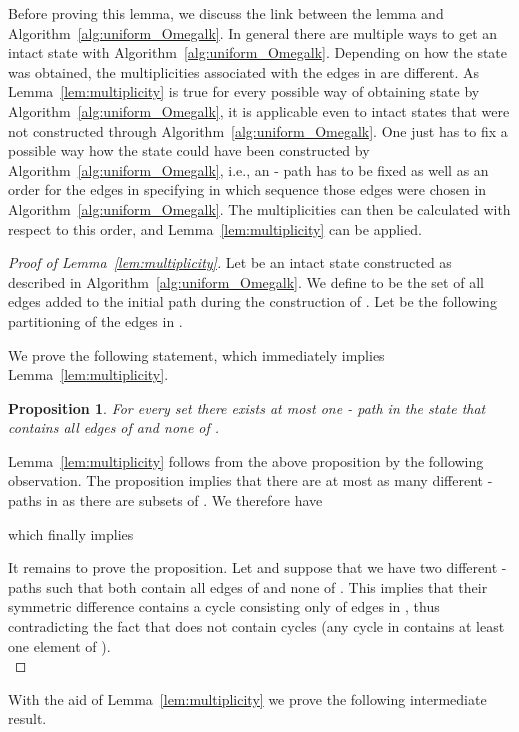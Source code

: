 \documentclass{article}
\newtheorem*{proposition*}{Proposition}
\begin{document}
Before proving this lemma, we discuss the link between the lemma
and Algorithm~\ref{alg:uniform_Omegalk}. In general there
are multiple ways to get an intact state  with
Algorithm~\ref{alg:uniform_Omegalk}. Depending on how the
state  was obtained, the multiplicities associated with
the edges in  are different. As
Lemma~\ref{lem:multiplicity} is true for every possible way
of obtaining state  by Algorithm~\ref{alg:uniform_Omegalk}, it
is applicable even to intact states that were not
constructed through Algorithm~\ref{alg:uniform_Omegalk}. One
just has to fix a possible way how the state  could have
been constructed by Algorithm~\ref{alg:uniform_Omegalk},
i.e., an - path  has to be fixed as well
as an order for the edges in  specifying in
which sequence those edges were chosen in
Algorithm~\ref{alg:uniform_Omegalk}.
The multiplicities can then be calculated with respect to this order, and
Lemma~\ref{lem:multiplicity} can be applied.

\begin{proof}[Proof of Lemma~\ref{lem:multiplicity}]
Let  be an intact state
constructed as described in
Algorithm~\ref{alg:uniform_Omegalk}. We define
 to be the set of
all edges added to the initial path  during the
construction of . Let  be
the following partitioning of the edges in .

We prove the following statement, which immediately
implies Lemma~\ref{lem:multiplicity}.

\begin{proposition*}
For every set  there exists at
most one - path in the state  that contains all
edges of  and none of .
\end{proposition*}

Lemma~\ref{lem:multiplicity} follows from the above
proposition by the following observation. The proposition
implies that there are at most as many different -
paths in  as there are subsets of . We
therefore have

which finally implies


It remains to prove the proposition. Let  and suppose that we have two different
- paths  such that both
contain all edges of  and none of
. This implies that their
symmetric difference 
contains a cycle consisting only of edges in , thus
contradicting the fact that  does not contain cycles
(any cycle in  contains at least one element of ).\\
\end{proof}

With the aid of Lemma~\ref{lem:multiplicity} we prove
the following intermediate result.
\end{document}
